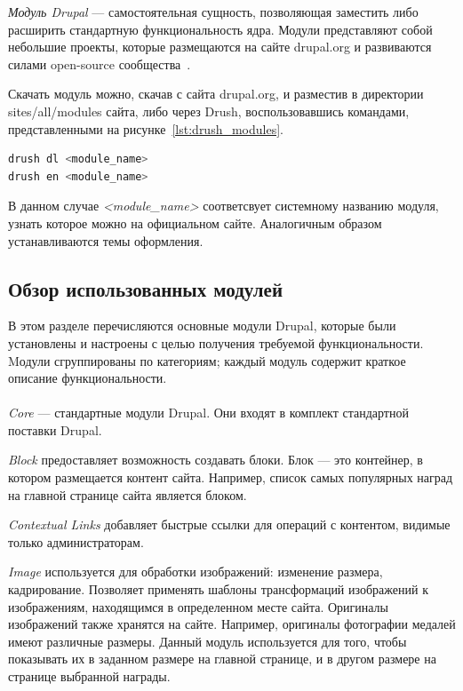 \textit{Модуль Drupal} --- самостоятельная сущность, позволяющая заместить либо
расширить стандартную функциональность ядра. 
Модули представляют собой небольшие проекты, которые размещаются на сайте
drupal.org и развиваются силами open-source сообщества~\cite{drupal_modules}.

Скачать модуль можно, скачав с сайта drupal.org, и разместив в директории
sites/all/modules сайта, либо через Drush, воспользовавшись командами,
представленными на рисунке~\ref{lst:drush_modules}.

\begin{lstlisting}[language=bash,
  caption=Установка модуля Drupal с использованием Drush,
  label=lst:drush_modules]
drush dl <module_name>
drush en <module_name>
\end{lstlisting}

В данном случае \textit{<module\_name>} соответсвует системному названию модуля,
узнать которое можно на официальном сайте.
Аналогичным образом устанавливаются темы оформления.

\subsection{Обзор использованных модулей}
\label{ssec:modules_overlook}

В этом разделе перечисляются основные модули Drupal,
которые были установлены и настроены с целью получения требуемой функциональности.
Mодули сгруппированы по категориям; каждый модуль содержит краткое описание функциональности.

\paragraph{}
\textit{Core} --- стандартные модули Drupal. Они входят в комплект стандартной поставки Drupal.

\textit{Block} предоставляет возможность создавать блоки. 
Блок --- это контейнер, в котором размещается контент сайта.
Например, список самых популярных наград на главной странице сайта является блоком.

\textit{Contextual Links} добавляет быстрые ссылки для операций с контентом,
видимые только администраторам.

\textit{Image} используется для обработки изображений: изменение размера, кадрирование.
Позволяет применять шаблоны трансформаций изображений к изображениям,
находящимся в определенном месте сайта. Оригиналы изображений также хранятся на сайте.
Например, оригиналы фотографии медалей имеют различные размеры. 
Данный модуль используется для того, чтобы показывать их в заданном размере
на главной странице, и в другом размере на странице выбранной награды.

